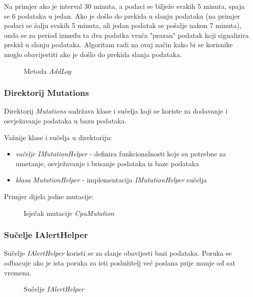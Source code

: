 \documentclass[zavrsnirad]{fer}
\begin{document}
Na primjer ako je interval 30 minuta, a podaci se bilježe svakih 5 minuta, spaja se 6 podataka u jedan. Ako je došlo do prekida u slanju podataka (na primjer podaci se šalju svakih 5 minuta, ali jedan podatak se pošalje nakon 7 minuta), onda se za period između ta dva podatka vraća "prazan" podatak koji signalizira prekid u slanju podataka. Algoritam radi na ovaj način kako bi se korisnike moglo obavijestiti ako je došlo do prekida slanja podataka.

\begin{figure}[htb]
	\centering
	
	\caption{Metoda \textit{AddLog}}
\end{figure}
\FloatBarrier

\subsubsection{Direktorij Mutations}
Direktorij \textit{Mutations} sadržava klase i sučelja koji se koriste za dodavanje i osvježavanje podataka u bazu podataka.

Važnije klase i sučelja u direktoriju:
\begin{itemize}
	\item \textit{sučelje IMutationHelper} - definira funkcionalnosti koje su potrebne za umetanje, osvježavanje i brisanje podataka iz baze podataka
	\item \textit{klasa MutationHelper} - implementacija \textit{IMutationHelper} sučelja
\end{itemize}

Primjer dijela jedne mutacije:
\begin{figure}[htb]
	\centering
	
	\caption{Isječak mutacije \textit{CpuMutation}}
\end{figure}
\FloatBarrier

\subsubsection{Sučelje IAlertHelper}
Sučelje \textit{IAlertHelper} koristi se za slanje obavijesti bazi podataka. Poruka se odbacuje ako je ista poruka za isti poslužitelj već poslana prije manje od sat vremena.
\begin{figure}[htb]
	\centering
	
	\caption{Sučelje \textit{IAlertHelper}}
\end{figure}
\FloatBarrier
\end{document}
